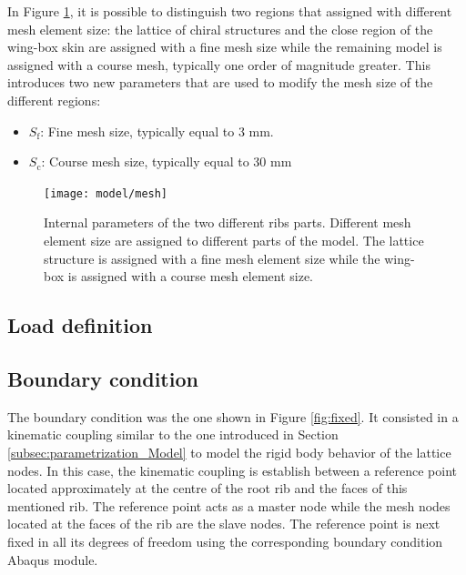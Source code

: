     In Figure \ref{fig:mesh}, it is possible to distinguish two regions that assigned with different mesh element size: the lattice of chiral structures and the close region of the wing-box skin are assigned with a fine mesh size while the remaining model is assigned with a course mesh, typically one order of magnitude greater. This introduces two new parameters that are used to modify the mesh size of the different regions:
    \begin{itemize}
      \item $S_{\mathrm{f}}$: Fine mesh size, typically equal to 3 mm.
      \item $S_{\mathrm{c}}$: Course mesh size, typically equal to 30 mm
    \end{itemize}

    \begin{figure}[!htpb]
      \centering
      \texttt{[image: model/mesh]}
      \caption[Internal parameters of the two different ribs parts]{Internal parameters of the two different ribs parts. Different mesh element size are assigned to different parts of the model. The lattice structure is assigned with a fine mesh element size while the wing-box is assigned with a course mesh element size.}\label{fig:mesh}
    \end{figure}

  \clearpage
  \subsection{Load definition} \label{subsec:load_computationalModel}

  \clearpage
  \subsection{Boundary condition} \label{subsec:boundary_computationalModel}

    The boundary condition was the one shown in Figure \ref{fig:fixed}. It consisted in a kinematic coupling similar to the one introduced in Section \ref{subsec:parametrization_Model} to model the rigid body behavior of the lattice nodes. In this case, the kinematic coupling is establish between a reference point located approximately at the centre of the root rib and the faces of this mentioned rib. The reference point acts as a master node while the mesh nodes located at the faces of the rib are the slave nodes. The reference point is next fixed in all its degrees of freedom using the corresponding boundary condition Abaqus module.

